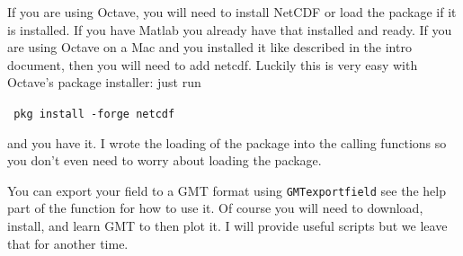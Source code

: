 \documentclass[11pt]{article}
\begin{document}
If you are using Octave, you will need to install NetCDF or load the package if it is installed. If you have Matlab you already have that installed and ready. If you are using Octave on a Mac and you installed it like described in the intro document, then you will need to add netcdf. 
Luckily this is very easy with Octave's package installer: just run

\qquad\verb+ pkg install -forge netcdf+

and you have it. I wrote the loading of the package into the calling functions so you don't even need to worry about loading the package.

You can export your field to a GMT format using \verb+GMTexportfield+ see the help part of the function for how to use it. Of course you will need to download, install, and learn GMT to then plot it. I will provide useful scripts but we leave that for another time.
\end{document}
